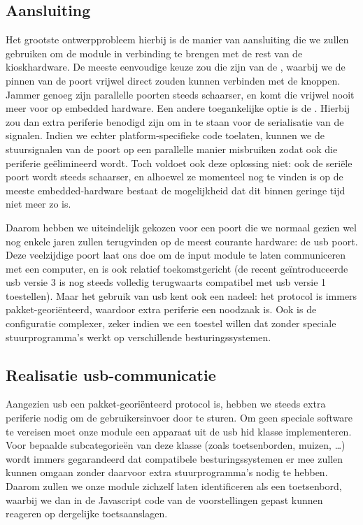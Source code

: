 \subsection{Aansluiting}

Het grootste ontwerpprobleem hierbij is de manier van aansluiting die we zullen gebruiken om de module in verbinding te brengen met de rest van de kioskhardware. De meeste eenvoudige keuze zou die zijn van de , waarbij we de pinnen van de poort vrijwel direct zouden kunnen verbinden met de knoppen. Jammer genoeg zijn parallelle poorten steeds schaarser, en komt die vrijwel nooit meer voor op embedded hardware. Een andere toegankelijke optie is de . Hierbij zou dan extra periferie benodigd zijn om in te staan voor de serialisatie van de signalen. Indien we echter platform-specifieke code toelaten, kunnen we de stuursignalen van de poort op een parallelle manier misbruiken zodat ook die periferie geëlimineerd wordt. Toch voldoet ook deze oplossing niet: ook de seriële poort wordt steeds schaarser, en alhoewel ze momenteel nog te vinden is op de meeste embedded-hardware bestaat de mogelijkheid dat dit binnen geringe tijd niet meer zo is.

Daarom hebben we uiteindelijk gekozen voor een poort die we normaal gezien wel nog enkele jaren zullen terugvinden op de meest courante hardware: de \ac{usb} poort. Deze veelzijdige poort laat ons doe om de input module te laten communiceren met een computer, en is ook relatief toekomstgericht (de recent geïntroduceerde \ac{usb} versie 3 is nog steeds volledig terugwaarts compatibel met \ac{usb} versie 1 toestellen). Maar het gebruik van \ac{usb} kent ook een nadeel: het protocol is immers pakket-georiënteerd, waardoor extra periferie een noodzaak is. Ook is de configuratie complexer, zeker indien we een toestel willen dat zonder speciale stuurprogramma's werkt op verschillende besturingssystemen.

\subsection{Realisatie \acs{usb}-communicatie}

Aangezien \ac{usb} een pakket-georiënteerd protocol is, hebben we steeds extra periferie nodig om de gebruikersinvoer door te sturen. Om geen speciale software te vereisen moet onze module een apparaat uit de \ac{usb} \ac{hid} klasse implementeren. Voor bepaalde subcategorieën van deze klasse (zoals toetsenborden, muizen, \dots) wordt immers gegarandeerd dat compatibele besturingssystemen er mee zullen kunnen omgaan zonder daarvoor extra stuurprogramma's nodig te hebben. Daarom zullen we onze module zichzelf laten identificeren als een toetsenbord, waarbij we dan in de Javascript code van de voorstellingen gepast kunnen reageren op dergelijke toetsaanslagen.


